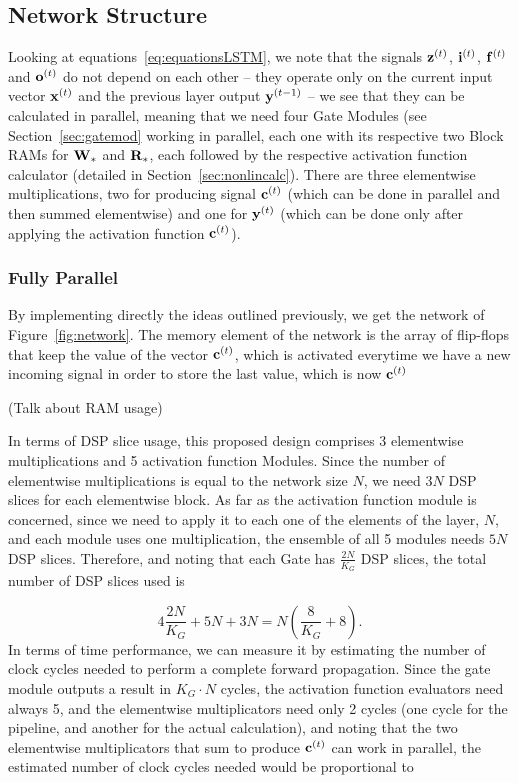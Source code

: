 \subsection{Network Structure}\label{sec:hLSTM-struct}
Looking at equations~\ref{eq:equationsLSTM}, we note that the signals $\mathbf{z}^{(t)}$, $\mathbf{i}^{(t)}$, $\mathbf{f}^{(t)}$ and $\mathbf{o}^{(t)}$ do not depend on each other -- they operate only on the current input vector $\mathbf{x}^{(t)}$ and the previous layer output $\mathbf{y}^{(t-1)}$ -- we see that they can be calculated in parallel, meaning that we need four Gate Modules (see Section~\ref{sec:gatemod} working in parallel, each one with its respective two Block RAMs for $\mathbf{W}_*$ and $\mathbf{R}_*$, each followed by the respective activation function calculator (detailed in Section~\ref{sec:nonlincalc}). There are three elementwise multiplications, two for producing signal $\mathbf{c}^{(t)}$ (which can be done in parallel and then summed elementwise) and one for $\mathbf{y}^{(t)}$ (which can be done only after applying the activation function $\mathbf{c}^{(t)}$).

\subsubsection{Fully Parallel}\label{sec:struct-fullpar}
By implementing directly the ideas outlined previously, we get the network of Figure~\ref{fig:network}. The memory element of the network is the array of flip-flops that keep the value of the vector $\mathbf{c}^{(t)}$, which is activated everytime we have a new incoming signal in order to store the last value, which is now $\mathbf{c}^{(t)}$

(Talk about RAM usage)

In terms of DSP slice usage, this proposed design comprises 3 elementwise multiplications and 5 activation function Modules. Since the number of elementwise multiplications is equal to the network size $N$, we need $3N$ DSP slices for each elementwise block. As far as the activation function module is concerned, since we need to apply it to each one of the elements of the layer, $N$, and each module uses one multiplication, the ensemble of all 5 modules needs $5N$ DSP slices. Therefore, and noting that each Gate has $\frac{2N}{K_G}$ DSP slices, the total number of DSP slices used is

\begin{equation}\label{eq:numdsp_network}
    4\frac{2N}{K_G} + 5N + 3N = N \left( \frac{8}{K_G} + 8 \right).
\end{equation}
In terms of time performance, we can measure it by estimating the number of clock cycles needed to perform a complete forward propagation. Since the gate module outputs a result in $K_G \cdot N$ cycles, the activation function evaluators need always 5, and the elementwise multiplicators need only 2 cycles (one cycle for the pipeline, and another for the actual calculation), and noting that the two elementwise multiplicators that sum to produce $\mathbf{c}^{(t)}$ can work in parallel, the estimated number of clock cycles needed would be proportional to 

